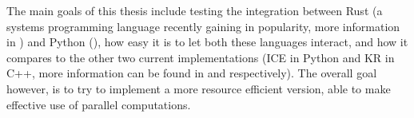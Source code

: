 The main goals of this thesis include testing the integration between Rust (a
systems programming language recently gaining in popularity, more information
in ) and Python (), how easy it is to
let both these languages interact, and how it compares to the other two current
implementations (ICE in Python and KR in C++, more information can be found in
 and  respectively). The overall goal
however, is to try to implement a more resource efficient version, able to make
effective use of parallel computations.


